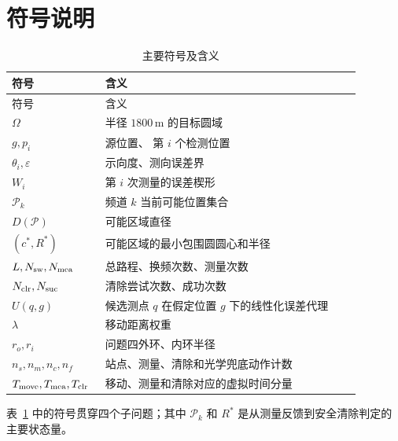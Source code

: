 \section{符号说明}
\begin{longtable}{p{0.2\linewidth}p{0.68\linewidth}}
\caption{主要符号及含义}\label{tab:q1-notation}\\
\toprule 符号 & 含义 \\
\midrule\endfirsthead
\toprule 符号 & 含义 \\
\midrule\endhead
$\Omega$ & 半径 $1800\,\mathrm m$ 的目标圆域 \\
$g,p_i$ & 源位置、 第 $i$ 个检测位置 \\
$\theta_i,\varepsilon$ & 示向度、测向误差界 \\
$W_i$ & 第 $i$ 次测量的误差楔形 \\
$\mathcal P_k$ & 频道 $k$ 当前可能位置集合 \\
$D(\mathcal P)$ & 可能区域直径 \\
$(c^*,R^*)$ & 可能区域的最小包围圆圆心和半径 \\
$L,N_{\rm sw},N_{\rm mea}$ & 总路程、换频次数、测量次数 \\
$N_{\rm clr},N_{\rm suc}$ & 清除尝试次数、成功次数 \\
$U(q,g)$ & 候选测点 $q$ 在假定位置 $g$ 下的线性化误差代理 \\
$\lambda$ & 移动距离权重 \\
$r_o,r_i$ & 问题四外环、内环半径 \\
$n_s,n_m,n_c,n_f$ & 站点、测量、清除和光学兜底动作计数 \\
$T_{\rm move},T_{\rm mea},T_{\rm clr}$ & 移动、测量和清除对应的虚拟时间分量 \\
\bottomrule
\end{longtable}

表~\ref{tab:q1-notation} 中的符号贯穿四个子问题；其中 $\mathcal P_k$ 和 $R^*$ 是从测量反馈到安全清除判定的主要状态量。

